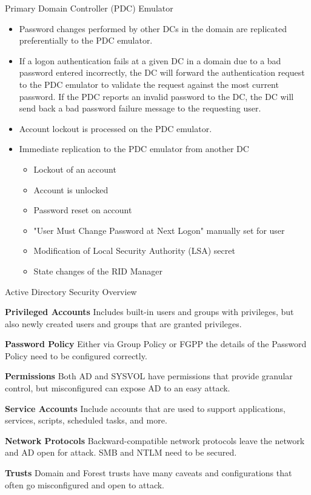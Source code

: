Primary Domain Controller (PDC) Emulator
\begin{itemize}
    \item Password changes performed by other DCs in the domain are replicated preferentially to the PDC emulator.
    \item If a logon authentication fails at a given DC in a domain due to a bad password entered incorrectly, the DC will forward the authentication request to the PDC emulator to validate the request against the most current password. If the PDC reports an invalid password to the DC, the DC will send back a bad password failure message to the requesting user.
    \item Account lockout is processed on the PDC emulator.
    \item Immediate replication to the PDC emulator from another DC
    \begin{itemize}
        \item Lockout of an account
        \item Account is unlocked
        \item Password reset on account
        \item "User Must Change Password at Next Logon" manually set for user
        \item Modification of Local Security Authority (LSA) secret
        \item State changes of the RID Manager
    \end{itemize}
\end{itemize}

Active Directory Security Overview

\textbf{Privileged Accounts}
Includes built-in users and groups with privileges, but also newly created users and groups that are granted privileges.

\textbf{Password Policy}
Either via Group Policy or FGPP the details of the Password Policy need to be configured correctly.

\textbf{Permissions}
Both AD and SYSVOL have permissions that provide granular control, but misconfigured can expose AD to an easy attack.

\textbf{Service Accounts}
Include accounts that are used to support applications, services, scripts, scheduled tasks, and more.

\textbf{Network Protocols}
Backward-compatible network protocols leave the network and AD open for attack. SMB and NTLM need to be secured.

\textbf{Trusts}
Domain and Forest trusts have many caveats and configurations that often go misconfigured and open to attack.

